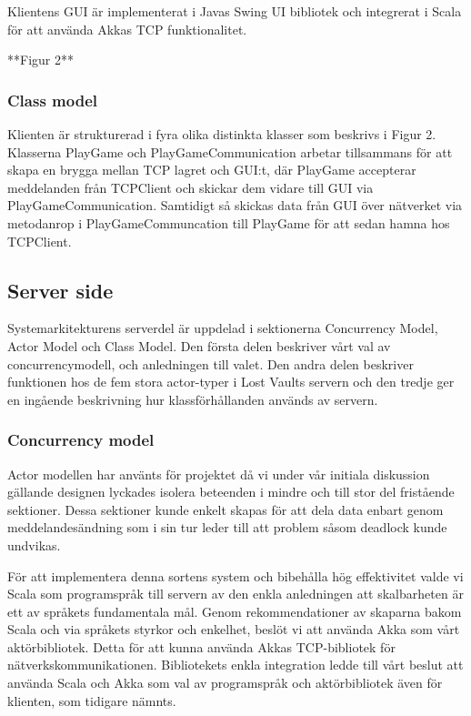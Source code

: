\documentclass[a4paper]{article}
\begin{document}
Klientens GUI är implementerat i Javas Swing UI bibliotek och integrerat i Scala för att använda Akkas TCP funktionalitet.

**Figur 2**
    
\subsubsection{Class model}
Klienten är strukturerad i fyra olika distinkta klasser som beskrivs i Figur 2. Klasserna PlayGame och PlayGameCommunication arbetar 
tillsammans för att skapa en brygga mellan TCP lagret och GUI:t, där PlayGame accepterar meddelanden från TCPClient och skickar dem 
vidare till GUI via PlayGameCommunication. Samtidigt så skickas data från GUI över nätverket via metodanrop i PlayGameCommuncation till 
PlayGame för att sedan hamna hos TCPClient.

\subsection{Server side}
Systemarkitekturens serverdel är uppdelad i sektionerna Concurrency Model, Actor Model och Class Model. Den första delen beskriver vårt 
val av concurrencymodell, och anledningen till valet. Den andra delen beskriver funktionen hos de fem stora actor-typer i Lost Vaults servern och 
den tredje ger en ingående beskrivning hur klassförhållanden används av servern.

\subsubsection{Concurrency model}
Actor modellen har använts för projektet då vi under vår initiala diskussion gällande designen lyckades isolera beteenden i mindre och till stor del 
fristående sektioner. Dessa sektioner kunde enkelt skapas för att dela data enbart genom meddelandesändning som i sin tur leder till att problem 
såsom deadlock kunde undvikas. 

För att implementera denna sortens system och bibehålla hög effektivitet valde vi Scala som programspråk till servern av den enkla anledningen att 
skalbarheten är ett av språkets fundamentala mål. Genom rekommendationer av skaparna bakom Scala och via språkets styrkor och enkelhet, beslöt vi 
att använda Akka som vårt aktörbibliotek. Detta för att kunna använda Akkas TCP-bibliotek för nätverkskommunikationen. Bibliotekets enkla integration 
ledde till vårt beslut att använda Scala och Akka som val av programspråk och aktörbibliotek även för klienten, som tidigare nämnts.                    
\end{document}

